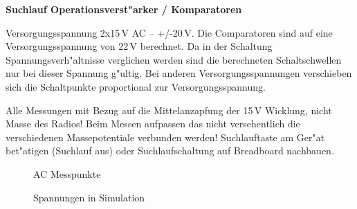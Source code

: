 \documentclass[ngerman,11pt,parskip=half] {scrartcl}
\begin{document}
\textbf{Suchlauf Operationsverst"arker / Komparatoren}

Versorgungsspannung 2x15\,V AC -- +/-20\,V. Die Comparatoren sind auf eine Versorgungsspannung von 22\,V berechnet. Da in der Schaltung Spannungsverh"altnisse verglichen werden sind die berechneten Schaltschwellen nur bei dieser Spannung g"ultig. Bei anderen Versorgungsspannungen verschieben sich die Schaltpunkte proportional zur Versorgungsspannung.

Alle Messungen mit Bezug auf die Mittelanzapfung der 15\,V Wicklung, nicht Masse des Radios! Beim Messen aufpassen das nicht versehentlich die verschiedenen Massepotentiale verbunden werden! Suchlauftaste am Ger"at bet"atigen (Suchlauf aus) oder Suchlaufschaltung auf Breadboard nachbauen.

\begin{figure}[H]
\centering
{}
\caption{AC Messpunkte} \label{fig:1}
\end{figure}

\begin{figure}[H]
\centering
{}
\caption{Spannungen in Simulation} \label{fig:1}
\end{figure}
\end{document}
